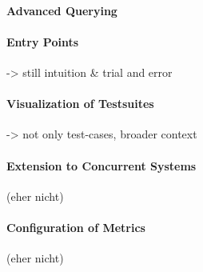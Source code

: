 \paragraph{Advanced Querying}

\paragraph{Entry Points} -> still intuition \& trial and error

\paragraph{Visualization of Testsuites} -> not only test-cases, broader context

\paragraph{Extension to Concurrent Systems} (eher nicht)

\paragraph{Configuration of Metrics} (eher nicht)